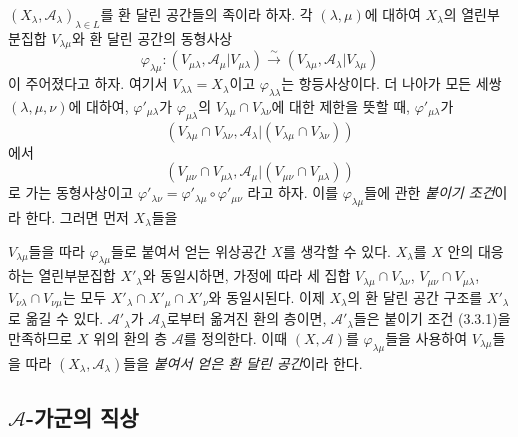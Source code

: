\begin{env}[4.1.7]
\label{0.4.1.7-ko}
$(X_\lambda,\mathcal A_\lambda)_{\lambda\in L}$를 환 달린 공간들의 족이라 하자. 각 $(\lambda,\mu)$에 대하여 $X_\lambda$의 열린부분집합 $V_{\lambda\mu}$와 환 달린 공간의 동형사상
\[
  \varphi_{\lambda\mu}:
  (V_{\mu\lambda},\mathcal A_\mu|V_{\mu\lambda})
  \xrightarrow{\sim}
  (V_{\lambda\mu},\mathcal A_\lambda|V_{\lambda\mu})
\]
이 주어졌다고 하자. 여기서 $V_{\lambda\lambda}=X_\lambda$이고 $\varphi_{\lambda\lambda}$는 항등사상이다. 더 나아가 모든 세쌍 $(\lambda,\mu,\nu)$에 대하여, $\varphi'_{\mu\lambda}$가 $\varphi_{\mu\lambda}$의 $V_{\lambda\mu}\cap V_{\lambda\nu}$에 대한 제한을 뜻할 때, $\varphi'_{\mu\lambda}$가
\[
  (V_{\lambda\mu}\cap V_{\lambda\nu},
   \mathcal A_\lambda|(V_{\lambda\mu}\cap V_{\lambda\nu}))
\]
에서
\[
  (V_{\mu\nu}\cap V_{\mu\lambda},
   \mathcal A_\mu|(V_{\mu\nu}\cap V_{\mu\lambda}))
\]
로 가는 동형사상이고
$\varphi'_{\lambda\nu}=\varphi'_{\lambda\mu}\circ\varphi'_{\mu\nu}$
라고 하자. 이를 $\varphi_{\lambda\mu}$들에 관한 \emph{붙이기 조건}이라 한다. 그러면 먼저 $X_\lambda$들을

$V_{\lambda\mu}$들을 따라 $\varphi_{\lambda\mu}$들로 붙여서 얻는 위상공간 $X$를 생각할 수 있다. $X_\lambda$를 $X$ 안의 대응하는 열린부분집합 $X'_\lambda$와 동일시하면, 가정에 따라 세 집합
$V_{\lambda\mu}\cap V_{\lambda\nu}$,
$V_{\mu\nu}\cap V_{\mu\lambda}$,
$V_{\nu\lambda}\cap V_{\nu\mu}$는 모두
$X'_\lambda\cap X'_\mu\cap X'_\nu$와 동일시된다. 이제 $X_\lambda$의 환 달린 공간 구조를 $X'_\lambda$로 옮길 수 있다. $\mathcal A'_\lambda$가 $\mathcal A_\lambda$로부터 옮겨진 환의 층이면, $\mathcal A'_\lambda$들은 붙이기 조건 (3.3.1)을 만족하므로 $X$ 위의 환의 층 $\mathcal A$를 정의한다. 이때 $(X,\mathcal A)$를 $\varphi_{\lambda\mu}$들을 사용하여 $V_{\lambda\mu}$들을 따라 $(X_\lambda,\mathcal A_\lambda)$들을 \emph{붙여서 얻은 환 달린 공간}이라 한다.
\end{env}

\subsection{$\mathcal A$-가군의 직상}
\label{subsection:0.4.2-ko}

